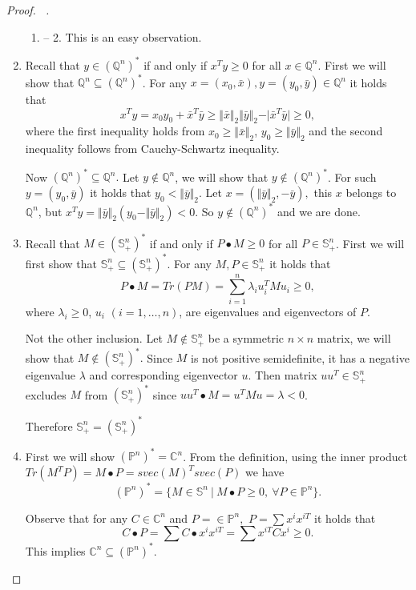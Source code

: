 \documentclass[12pt]{book}
\theoremstyle{definition}
\begin{document}
\begin{appendix}
\begin{proof}[Proof. \ ]
\begin{enumerate}
\item[\ 1. -- 2.] This is an easy observation.
\setcounter{enumi}{2}
\item Recall that $y\in(\mathbb{Q}^n)^*$ if and only if $x^Ty \geq 0$ for all $x\in\mathbb{Q}^n$. First we will show that $\mathbb{Q}^n \subseteq (\mathbb{Q}^n)^*$. For any $x = (x_0,\bar{x}),y=(y_0,\bar{y})\in \mathbb{Q}^n $ it holds that
$$ x^Ty = x_0y_0 + \bar{x}^T\bar{y} \geq \Vert \bar{x}\Vert_2 \Vert \bar{y}\Vert_2 - \vert \bar{x}^T\bar{y}\vert \geq 0,$$ where the first inequality holds from $x_0\geq \Vert \bar{x}\Vert_2$,  $y_0\geq \Vert \bar{y}\Vert_2$ and the second inequality follows from Cauchy-Schwartz inequality.

Now $(\mathbb{Q}^n)^* \subseteq \mathbb{Q}^n.$ Let $y\notin \mathbb{Q}^n$, we will show that $y\notin (\mathbb{Q}^n)^*$.
For such $y = (y_0,\bar{y})$ it holds that $y_0<\Vert \bar{y}\Vert_2$. Let $x = (\Vert \bar{y}\Vert_2, -\bar{y}),$ 
this $x$ belongs to $\mathbb{Q}^n$, but $x^Ty = \Vert \bar{y}\Vert_2(y_0-\Vert \bar{y}\Vert_2)<0$. So $y\notin (\mathbb{Q}^n)^*$ and we are done.

\item Recall that $M \in (\mathbb{S}^n_+)^*$ if and only if $P\bullet M \geq 0$ for all $P\in \mathbb{S}^n_+$. First we will first show that $\mathbb{S}^n_+ \subseteq (\mathbb{S}^n_+)^*$. For any $M,P\in \mathbb{S}^n_+$ it holds that 
$$P\bullet M = Tr(PM) = \sum_{i=1}^n \lambda_iu_i^TMu_i \geq 0,$$
where $\lambda_i\geq 0$, $u_i$  $(i=1,\dots ,n)$, are eigenvalues and eigenvectors of $P$.

Not the other inclusion. Let $M\notin \mathbb{S}^n_+$ be a symmetric $n\times n$ matrix, we will show that $M\notin (\mathbb{S}^n_+)^*.$ Since $M$ is not positive semidefinite, it has a negative eigenvalue $\lambda$ and corresponding eigenvector $u$. Then matrix $uu^T\in \mathbb{S}^n_+$ excludes $M$ from $(\mathbb{S}^n_+)^*$ since $uu^T\bullet M = u^TMu = \lambda <0$.

Therefore $\mathbb{S}^n_+ = (\mathbb{S}^n_+)^*$

\item First we will show $(\mathbb{P}^n)^* = \mathbb{C}^n$. From the definition, using the inner product $Tr(M^TP) = M \bullet P = svec(M)^T svec(P)$ we have
$$ (\mathbb{P}^n)^* = \{ M \in \mathbb{S}^n \ \vert \ M\bullet P\geq 0, \ \forall P\in \mathbb{P}^n \}. $$

Observe that for any $C\in \mathbb{C}^n$ and $P = \in \mathbb{P}^n,$ $P = \sum x^ix^{iT}$ it holds that 
$$ C\bullet P = \sum C\bullet x^ix^{iT} = \sum x^{iT}Cx^i \geq 0.$$
This implies $\mathbb{C}^n\subseteq (\mathbb{P}^n)^*$.


\end{enumerate}
\end{proof}
\end{appendix}
\end{document}
